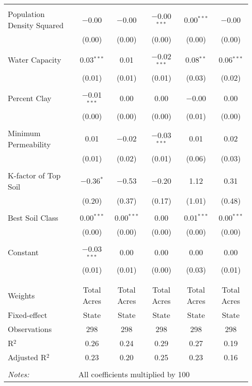 \documentclass[10pt]{article}
\begin{document}
\begin{table}[!htbp]
\begin{tabular}{@{\extracolsep{5pt}}lccccc}
  & & & & & \\ 
 Population Density Squared & $-$0.00 & $-$0.00 & $-$0.00$^{***}$ & 0.00$^{***}$ & $-$0.00 \\ 
  & (0.00) & (0.00) & (0.00) & (0.00) & (0.00) \\ 
  & & & & & \\ 
 Water Capacity & 0.03$^{***}$ & 0.01 & $-$0.02$^{***}$ & 0.08$^{**}$ & 0.06$^{***}$ \\ 
  & (0.01) & (0.01) & (0.01) & (0.03) & (0.02) \\ 
  & & & & & \\ 
 Percent Clay & $-$0.01$^{***}$ & 0.00 & 0.00 & $-$0.00 & 0.00 \\ 
  & (0.00) & (0.00) & (0.00) & (0.01) & (0.00) \\ 
  & & & & & \\ 
 Minimum Permeability & 0.01 & $-$0.02 & $-$0.03$^{***}$ & 0.01 & 0.02 \\ 
  & (0.01) & (0.02) & (0.01) & (0.06) & (0.03) \\ 
  & & & & & \\ 
 K-factor of Top Soil & $-$0.36$^{*}$ & $-$0.53 & $-$0.20 & 1.12 & 0.31 \\ 
  & (0.20) & (0.37) & (0.17) & (1.01) & (0.48) \\ 
  & & & & & \\ 
 Best Soil Class & 0.00$^{***}$ & 0.00$^{***}$ & 0.00 & 0.01$^{***}$ & 0.00$^{***}$ \\ 
  & (0.00) & (0.00) & (0.00) & (0.00) & (0.00) \\ 
  & & & & & \\ 
 Constant & $-$0.03$^{***}$ & 0.00 & 0.00 & 0.00 & 0.00 \\ 
  & (0.01) & (0.01) & (0.00) & (0.03) & (0.01) \\ 
  & & & & & \\ 
\hline \\[-1.8ex] 
Weights & Total Acres & Total Acres & Total Acres & Total Acres & Total Acres \\ 
Fixed-effect & State & State & State & State & State \\ 
Observations & 298 & 298 & 298 & 298 & 298 \\ 
R$^{2}$ & 0.26 & 0.24 & 0.29 & 0.27 & 0.19 \\ 
Adjusted R$^{2}$ & 0.23 & 0.20 & 0.25 & 0.23 & 0.16 \\ 
\hline 
\hline \\[-1.8ex] 
\textit{Notes:} & \multicolumn{5}{l}{All coefficients multiplied by 100} \\ 
\end{tabular} 
\end{table} 
\end{document}
